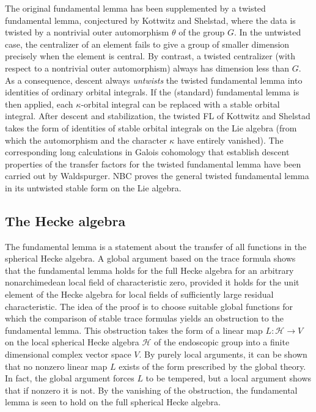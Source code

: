 \documentclass[brochure,english,12pt]{bourbaki}
\begin{document}
The original fundamental lemma has been supplemented by a twisted
fundamental lemma, conjectured by Kottwitz and Shelstad, where the
data is twisted by a nontrivial outer automorphism $\theta$ of the
group $G$.  In the untwisted case, the centralizer of an element fails
to give a group of smaller dimension precisely when the element is
central.  By contrast, a twisted centralizer (with respect to a
nontrivial outer automorphism) always has dimension less than $G$.  As
a consequence, descent always {\it untwists} the twisted fundamental
lemma into identities of ordinary orbital integrals.  If the
(standard) fundamental lemma is then applied, each $\kappa$-orbital
integral can be replaced with a stable orbital integral.  After
descent and stabilization, the twisted FL of Kottwitz and Shelstad
takes the form of identities of stable orbital integrals on the Lie
algebra (from which the automorphism and the character $\kappa$ have
entirely vanished).  The corresponding long calculations in Galois
cohomology that establish descent properties of the transfer factors
for the twisted fundamental lemma have been carried out by
Waldspurger.  NBC proves the general twisted fundamental lemma in
its untwisted stable form on the Lie algebra.



\subsection{The Hecke algebra}

The fundamental lemma is a statement about the transfer of all
functions in the spherical Hecke algebra.  A global argument based on
the trace formula shows that the fundamental lemma holds for the full
Hecke algebra for an arbitrary nonarchimedean local field of
characteristic zero, provided it holds for the unit element of the
Hecke algebra for local fields of sufficiently large residual
characteristic.  The idea of the proof is to choose suitable global
functions for which the comparison of stable trace formulas yields an
obstruction to the fundamental lemma.  This obstruction takes the form
of a linear map $L:{\mathcal H}\to V$ on the local spherical Hecke
algebra ${\mathcal H}$ of the endoscopic group into a finite
dimensional complex vector space $V$.  By purely local arguments, it
can be shown that no nonzero linear map $L$ exists of the form
prescribed by the global theory.  In fact, the global argument forces $L$
to be tempered, but a local argument shows that if nonzero it is not.
By the vanishing of the obstruction,
the fundamental lemma is seen to hold on the full spherical Hecke algebra.
\end{document}
